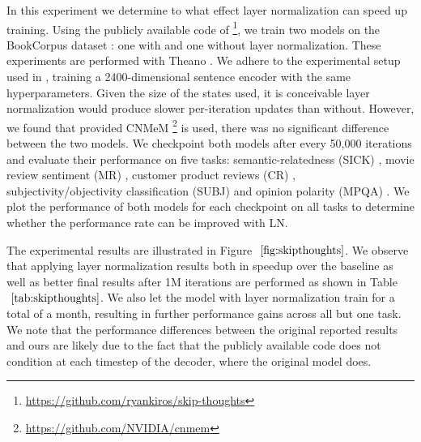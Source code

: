 \documentclass{article}
\begin{document}
In this experiment we determine to what effect layer normalization can speed up training. Using the publicly available code of \citet{kiros2015skip} \footnote{\url{https://github.com/ryankiros/skip-thoughts}}, we train two models on the BookCorpus dataset \citep{zhu2015aligning}: one with and one without layer normalization. These experiments are performed with Theano \citep{team2016theano}. We adhere to the experimental setup used in \citet{kiros2015skip}, training a 2400-dimensional sentence encoder with the same hyperparameters. Given the size of the states used, it is conceivable layer normalization would produce slower per-iteration updates than without. However, we found that provided CNMeM \footnote{\url{https://github.com/NVIDIA/cnmem}} is used, there was no significant difference between the two models. We checkpoint both models after every 50,000 iterations and evaluate their performance on five tasks: semantic-relatedness (SICK) \citep{marelli2014semeval}, movie review sentiment (MR) \citep{pang2005seeing}, customer product reviews (CR) \citep{hu2004mining}, subjectivity/objectivity classification (SUBJ) \citep{pang2004sentimental} and opinion polarity (MPQA) \citep{wiebe2005annotating}. We plot the performance of both models for each checkpoint on all tasks to determine whether the performance rate can be improved with LN.

The experimental results are illustrated in Figure $~\ref{fig:skipthoughts}$. We observe that applying layer normalization results both in speedup over the baseline as well as better final results after 1M iterations are performed as shown in Table $~\ref{tab:skipthoughts}$. We also let the model with layer normalization train for a total of a month, resulting in further performance gains across all but one task. We note that the performance differences between the original reported results and ours are likely due to the fact that the publicly available code does not condition at each timestep of the decoder, where the original model does.
\end{document}
